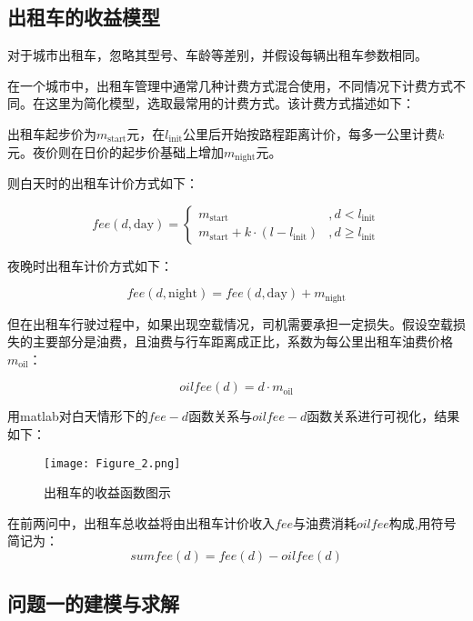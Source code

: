 \documentclass[withoutpreface,bwprint]{cumcmthesis} %
\begin{document}
\subsection{出租车的收益模型}
对于城市出租车，忽略其型号、车龄等差别，并假设每辆出租车参数相同。\par
在一个城市中，出租车管理中通常几种计费方式混合使用，不同情况下计费方式不同。在这里为简化模型，选取最常用的计费方式。该计费方式描述如下：\par
出租车起步价为$m_{\mathrm{start}}$元，在$l_{\mathrm{init}}$公里后开始按路程距离计价，每多一公里计费$k$元。夜价则在日价的起步价基础上增加$m_{\mathrm{night}}$元。\par
则白天时的出租车计价方式如下：\par
\begin{equation}
	fee(d,\mathrm{day})=\left\{
	\begin{array}{lr}
		m_{\mathrm{start}}                               & ,d<l_{\mathrm{init}}    \\
		m_{\mathrm{start}}+ k \cdot(l-l_{\mathrm{init}}) & ,d\ge l_{\mathrm{init}}
	\end{array}
	\right.
\end{equation}

夜晚时出租车计价方式如下：\par
\begin{equation}
	fee(d,\mathrm{night})=fee(d,\mathrm{day})+m_{\mathrm{night}}
\end{equation}

但在出租车行驶过程中，如果出现空载情况，司机需要承担一定损失。假设空载损失的主要部分是油费，且油费与行车距离成正比，系数为每公里出租车油费价格$m_{\mathrm{oil}}$：\par
\begin{equation}
	oilfee(d)=d\cdot m_{\mathrm{oil}}
\end{equation}

用matlab对白天情形下的$fee-d$函数关系与$oilfee-d$函数关系进行可视化，结果如下：\par
\begin{figure}[!h]
	\centering
	\texttt{[image: Figure\_2.png]}
	\caption{出租车的收益函数图示}
\end{figure}

在前两问中，出租车总收益将由出租车计价收入$fee$与油费消耗$oilfee$构成,用符号简记为：
\begin{equation}
	sumfee(d)=fee(d)-oilfee(d)
\end{equation}

\subsection{问题一的建模与求解}
\end{document}
